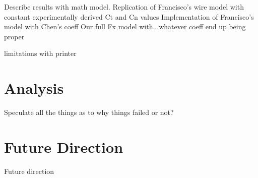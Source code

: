 \documentclass[letterpaper, 11 pt]{article}
\begin{document}
Describe results with math model. 
Replication of Francisco's wire model with constant experimentally derived Ct and Cn values
Implementation of Francisco's model with Chen's coeff
Our full Fx model with...whatever coeff end up being proper

limitations with printer

\section{Analysis}
Speculate all the things as to why things failed or not?

\section{Future Direction}
Future direction



\end{document}
